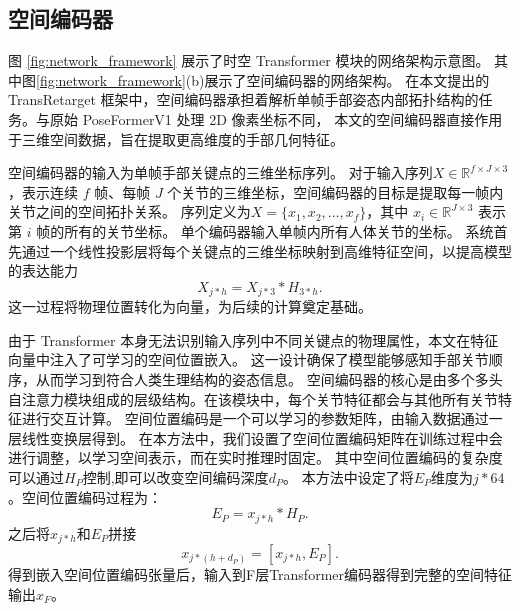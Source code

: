 \subsection{空间编码器}
图 \ref{fig:network_framework} 展示了时空 Transformer 模块的网络架构示意图。
其中图\ref{fig:network_framework}(b)展示了空间编码器的网络架构。
在本文提出的 TransRetarget 框架中，空间编码器承担着解析单帧手部姿态内部拓扑结构的任务。与原始 PoseFormerV1 处理 2D 像素坐标不同，
本文的空间编码器直接作用于三维空间数据，旨在提取更高维度的手部几何特征。


空间编码器的输入为单帧手部关键点的三维坐标序列。
对于输入序列$X \in \mathbb{R}^{f \times J \times 3}$，表示连续 $f$ 帧、每帧 $J$ 个关节的三维坐标，空间编码器的目标是提取每一帧内关节之间的空间拓扑关系。
序列定义为$X = \{x_1, x_2, \ldots, x_f\}$，其中 $x_i \in \mathbb{R}^{J \times 3}$ 表示第 $i$ 帧的所有的关节坐标。
单个编码器输入单帧内所有人体关节的坐标。
系统首先通过一个线性投影层将每个关键点的三维坐标映射到高维特征空间，以提高模型的表达能力
\begin{equation}
X_{j*h} = X_{j*3} * H_{3*h}.
\end{equation}
这一过程将物理位置转化为向量，为后续的计算奠定基础。

由于 Transformer 本身无法识别输入序列中不同关键点的物理属性，本文在特征向量中注入了可学习的空间位置嵌入。
这一设计确保了模型能够感知手部关节顺序，从而学习到符合人类生理结构的姿态信息。
空间编码器的核心是由多个多头自注意力模块组成的层级结构。在该模块中，每个关节特征都会与其他所有关节特征进行交互计算。
空间位置编码是一个可以学习的参数矩阵，由输入数据通过一层线性变换层得到。
在本方法中，我们设置了空间位置编码矩阵在训练过程中会进行调整，以学习空间表示，而在实时推理时固定。
其中空间位置编码的复杂度可以通过$H_{P}$控制,即可以改变空间编码深度$d_{P}$。
本方法中设定了将$E_{P}$维度为$j*64$。空间位置编码过程为：
\begin{equation}
E_{P} = x_{j*h} * H_{P}.
\end{equation}
之后将$x_{j*h}$和$E_{P}$拼接
\begin{equation}
x_{j*(h+d_{P})} = [x_{j*h} , E_{P}].
\end{equation}
得到嵌入空间位置编码张量后，输入到F层Transformer编码器得到完整的空间特征输出$x_F$。

